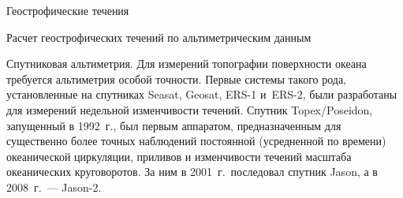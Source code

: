 \begin{chapter}{Геострофические течения}
\begin{section}{Расчет геострофических течений по альтиметрическим данным}
\begin{paragraph}{Спутниковая альтиметрия.}
%
Для измерений топографии поверхности океана требуется альтиметрия особой
точности. Первые системы такого рода, установленные на спутниках
Seasat, Geosat, ERS-1 и~ERS-2, 
были разработаны для измерений недельной
изменчивости течений. Спутник Topex/Poseidon, 
запущенный в 1992~г., был первым аппаратом, предназначенным для 
существенно более точных 
наблюдений постоянной (усредненной по времени) океанической
циркуляции, приливов и изменчивости течений масштаба океанических 
круговоротов. За ним в 2001~г.\ последовал спутник Jason, 
а в 2008~г.~--- Jason-2.
%


\end{paragraph}
\end{section}
\end{chapter}
